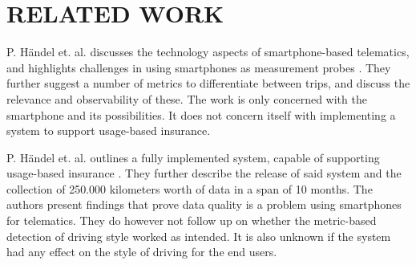 \section{RELATED WORK}\label{sec:relatedwork}

P. Händel et. al. discusses the technology aspects of smartphone-based telematics, and highlights challenges in using smartphones as measurement probes \citep{art:insurtelematics}. They further suggest a number of metrics to differentiate between trips, and discuss the relevance and observability of these. The work is only concerned with the smartphone and its possibilities. It does not concern itself with implementing a system to support usage-based insurance.

P. Händel et. al. outlines a fully implemented system, capable of supporting usage-based insurance \citep{art:smartphones_for_monitoring_and_ubi}. They further describe the release of said system and the collection of 250.000 kilometers worth of data in a span of 10 months. The authors present findings that prove data quality is a problem using smartphones for telematics. They do however not follow up on whether the metric-based detection of driving style worked as intended. It is also unknown if the system had any effect on the style of driving for the end users.